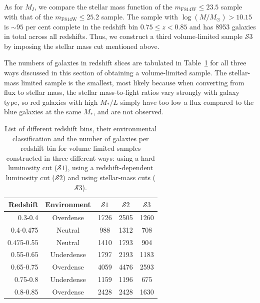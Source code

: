\documentclass[twocolumn,useAMS,usenatbib]{mn2e}
\newcommand{\s}{\ensuremath{\mathcal{S}}}
\begin{document}
As for $M_I$, we compare the stellar mass function of the $m_\text{F814W}\le23.5$ sample with that of the $m_\text{F814W}\le25.2$ sample. 
The sample with $\log(M/M_\odot) > 10.15$ is $\sim 95$ per cent
complete in the redshift bin $0.75 \le z< 0.85$ and has 8953
galaxies in total across all redshifts.
Thus, we construct a third volume-limited sample \s$3$ by imposing the
stellar mass cut mentioned above. 

The numbers of galaxies in redshift slices
are tabulated in Table~\ref{table:GalaxyCounts} for all three ways
discussed in this section of obtaining a volume-limited sample. The
stellar-mass limited sample is the smallest, most likely because when
converting from flux to stellar mass, the stellar mass-to-light ratios
vary strongly with galaxy type, so red galaxies with high $M_*/L$
simply have too low a flux compared to the blue galaxies at the same
$M_*$, and are not observed.

\begin{table} 
\centering
\begin{tabular}{|r|c|c|c|c|}
 \hline
 Redshift & Environment & \s$1$ & \s$2$ & \s$3$ \\
 \hline
 0.3-0.4 & Overdense & 1726 & 2505 & 1260 \\
 0.4-0.475 & Neutral & 988 & 1312 & 708 \\
 0.475-0.55 & Neutral & 1410 & 1793 & 904 \\
 0.55-0.65 & Underdense & 1797 & 2193 & 1183 \\
 0.65-0.75 & Overdense & 4059 & 4476 & 2593 \\
 0.75-0.8 & Underdense & 1159 & 1196 & 675 \\
 0.8-0.85 & Overdense & 2428 & 2428 & 1630 \\
 \hline
\end{tabular}
\caption{List of different redshift bins, their environmental
  classification and the number of galaxies per redshift bin for
  volume-limited samples constructed in three different ways: using a
  hard luminosity cut (\s$1$), using a redshift-dependent luminosity cut (\s$2$) and using stellar-mass cuts (\s$3$).}
\label{table:GalaxyCounts}
\end{table}
\end{document}
